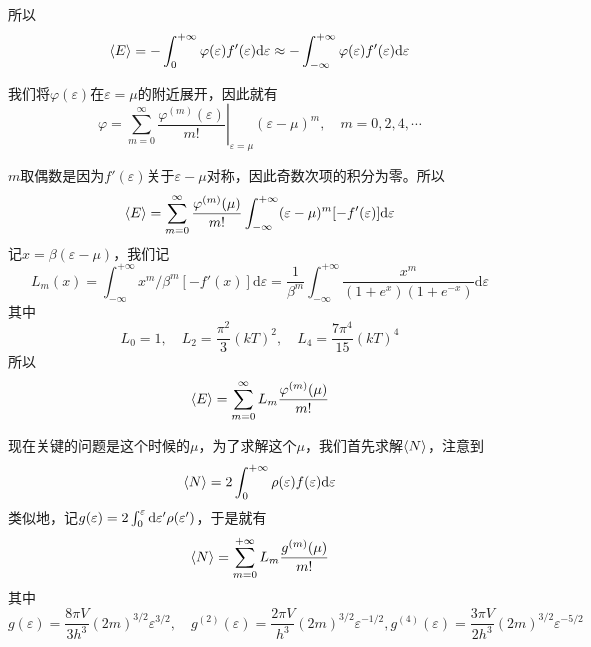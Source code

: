 所以\begin{equation}
    \braket{E} = -\int_{0}^{+\infty}\varphi(\varepsilon)f'(\varepsilon) \mathrm{d}\varepsilon \approx  -\int_{-\infty}^{+\infty}\varphi(\varepsilon)f'(\varepsilon) \mathrm{d}\varepsilon 
\end{equation}

我们将$\varphi(\varepsilon)$在$\varepsilon=\mu$的附近展开，因此就有\begin{equation}
    \varphi=\sum_{m=0}^\infty\left. \frac{\varphi^{(m)}(\varepsilon)}{m!}\right|_{\varepsilon=\mu}(\varepsilon-\mu)^m,\quad m=0,2,4,\cdots
\end{equation}

$m$取偶数是因为$f'(\varepsilon)$关于$\varepsilon-\mu$对称，因此奇数次项的积分为零。所以\begin{equation}
    \braket{E} =\sum_{m=0}^{\infty} \frac{\varphi^{(m)}(\mu)}{m!} \int_{-\infty}^{+\infty}(\varepsilon-\mu)^m [-f'(\varepsilon)] \mathrm{d}\varepsilon
\end{equation}
记$x=\beta(\varepsilon-\mu)$，我们记\begin{equation}
    L_m(x) = \int_{-\infty}^{+\infty}x^m/\beta^m [-f'(x)] \mathrm{d}\varepsilon=\frac{1}{\beta^m} \int_{-\infty}^{+\infty}\frac{x^m }{(1+e^x)(1+e^{-x})}\mathrm{d}\varepsilon 
\end{equation}
其中\[L_0 =1, \quad L_2=\frac{\pi^2}{3} (kT)^2,\quad L_4 =\frac{7\pi^4}{15} (kT)^4 \]
所以\begin{equation}
    \braket{E} =\sum_{m=0}^{\infty}L_m \frac{\varphi^{(m)}(\mu)}{m!}
\end{equation}

现在关键的问题是这个时候的$\mu$，为了求解这个$\mu$，我们首先求解$\braket{N}$，注意到\begin{equation}
    \braket{N} = 2  \int_{0}^{+\infty} \rho(\varepsilon) f(\varepsilon)\mathrm{d}\varepsilon 
\end{equation}
类似地，记$g(\varepsilon)=2\int_0^\varepsilon \mathrm{d} \varepsilon' \rho(\varepsilon')$，于是就有\begin{equation}
    \braket{N} =\sum_{m=0}^{+\infty} L_m\frac{g^{(m)}(\mu)}{m!}
\end{equation}
其中\[g(\varepsilon) = \frac{8\pi V}{3h^3} (2m)^{3/2} \varepsilon^{3/2},\quad g^{(2)} (\varepsilon) =\frac{2\pi V}{h^3} (2m)^{3/2} \varepsilon^{-1/2},g^{(4)}(\varepsilon)=\frac{3\pi V}{2h^3} (2m)^{3/2}\varepsilon^{-5/2}\]

